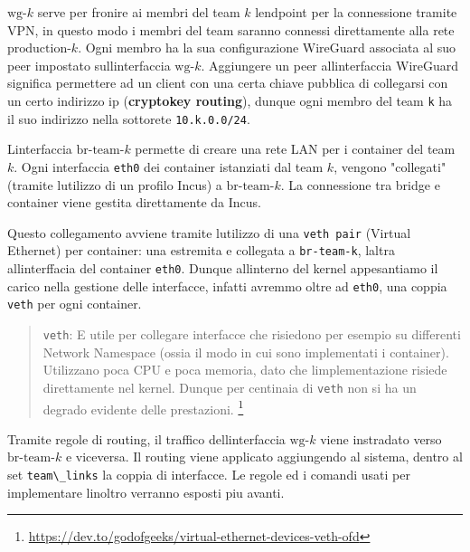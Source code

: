 \(\text{wg-}k\) serve per fronire ai membri del team \(k\)
l\textquotesingle endpoint per la connessione tramite VPN, in questo
modo i membri del team saranno connessi direttamente alla rete
\(\text{production-}k\). Ogni membro ha la sua configurazione WireGuard
associata al suo peer impostato sull\textquotesingle interfaccia
\(\text{wg-}k\). Aggiungere un peer all\textquotesingle interfaccia
WireGuard significa permettere ad un client con una certa chiave
pubblica di collegarsi con un certo indirizzo ip (\textbf{cryptokey
routing}), dunque ogni membro del team \passthrough{\lstinline!k!} ha il
suo indirizzo nella sottorete \passthrough{\lstinline!10.k.0.0/24!}.

L\textquotesingle interfaccia \(\text{br-team-}k\) permette di creare
una rete LAN per i container del team \(k\). Ogni interfaccia
\passthrough{\lstinline!eth0!} dei container istanziati dal team \(k\),
vengono "collegati" (tramite l\textquotesingle utilizzo di un profilo
Incus) a \(\text{br-team-}k\). La connessione tra bridge e container
viene gestita direttamente da Incus.

Questo collegamento avviene tramite l\textquotesingle utilizzo di una
\passthrough{\lstinline!veth pair!} (Virtual Ethernet) per container:
una estremita e\textquotesingle{} collegata a
\passthrough{\lstinline!br-team-k!}, l\textquotesingle altra
all\textquotesingle interffacia del container
\passthrough{\lstinline!eth0!}. Dunque all\textquotesingle interno del
kernel appesantiamo il carico nella gestione delle interfacce, infatti
avremmo oltre ad \passthrough{\lstinline!eth0!}, una coppia
\passthrough{\lstinline!veth!} per ogni container.

\begin{quote}
\passthrough{\lstinline!veth!}: E\textquotesingle{} utile per collegare
interfacce che risiedono per esempio su differenti Network Namespace
(ossia il modo in cui sono implementati i container). Utilizzano poca
CPU e poca memoria, dato che l\textquotesingle implementazione risiede
direttamente nel kernel. Dunque per centinaia di
\passthrough{\lstinline!veth!} non si ha un degrado evidente delle
prestazioni. \footnote{\label{fn:ref_15}\url{https://dev.to/godofgeeks/virtual-ethernet-devices-veth-ofd}}
\end{quote}

Tramite regole di routing, il traffico dell\textquotesingle interfaccia
\(\text{wg-}k\) viene instradato verso \(\text{br-team-}k\) e viceversa.
Il routing viene applicato aggiungendo al sistema, dentro al set
\passthrough{\lstinline!team\_links!} la coppia di interfacce. Le regole
ed i comandi usati per implementare l\textquotesingle inoltro verranno
esposti piu avanti.


